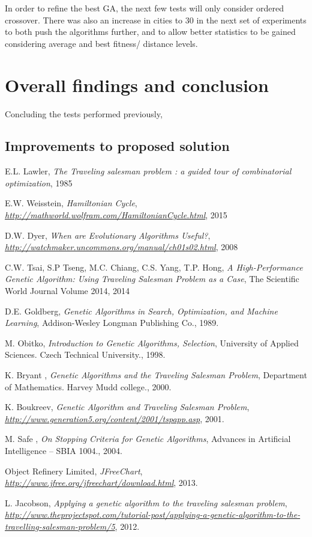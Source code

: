 \documentclass[article]{IEEEtran}
\begin{document}
In order to refine the best GA, the next few tests will only consider ordered crossover. There was also an increase in cities to 30 in the next set of experiments to both push the algorithms further, and to allow better statistics to be gained considering average and best fitness/ distance levels.

\section{Overall findings and conclusion}
Concluding the tests performed previously, 

\subsection{Improvements to proposed solution}

\begin{thebibliography}{9}

E.L. Lawler, \textit{The Traveling salesman problem : a guided tour of combinatorial optimization},
1985

E.W. Weisstein, \textit{Hamiltonian Cycle},
\textit{\url{http://mathworld.wolfram.com/HamiltonianCycle.html}}, 2015

D.W. Dyer, \textit{When are Evolutionary Algorithms Useful?},
\textit{\url{http://watchmaker.uncommons.org/manual/ch01s02.html}}, 2008

C.W. Tsai, S.P Tseng, M.C. Chiang, C.S. Yang, T.P. Hong, \textit{A High-Performance Genetic Algorithm: Using Traveling Salesman Problem as a Case},
The Scientific World Journal Volume 2014, 2014

D.E. Goldberg, \textit{Genetic Algorithms in Search, Optimization, and Machine Learning},
Addison-Wesley Longman Publishing Co., 1989. 

M. Obitko, \textit{Introduction to Genetic Algorithms, Selection},
University of Applied Sciences. Czech Technical University., 1998. 

K. Bryant , \textit{Genetic Algorithms and the Traveling Salesman Problem},
Department of Mathematics. Harvey Mudd college., 2000. 

K. Boukreev, \textit{Genetic Algorithm and Traveling Salesman Problem},
\textit{\url{http://www.generation5.org/content/2001/tspapp.asp}}, 2001.

M. Safe , \textit{On Stopping Criteria for Genetic Algorithms},
Advances in Artificial Intelligence – SBIA 1004., 2004. 

Object Refinery Limited, \textit{JFreeChart},
\textit{\url{http://www.jfree.org/jfreechart/download.html}}, 2013.

L. Jacobson, \textit{Applying a genetic algorithm to the traveling salesman problem},
\textit{\url{http://www.theprojectspot.com/tutorial-post/applying-a-genetic-algorithm-to-the-travelling-salesman-problem/5}}, 2012.

\end{thebibliography}
\end{document}
